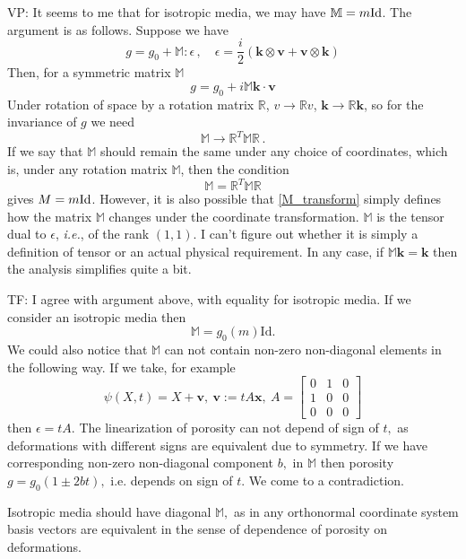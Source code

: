 \documentclass[12pt]{article}
\numberwithin{theorem}{section}
\begin{document}
\begin{framed} 
\color{red}
VP: It seems to me that for isotropic media, we may have $\mathbb{M}=m {\rm Id}$. The argument is as follows. Suppose we have 
\[ 
g=g_0 + \mathbb{M}: \epsilon \, , \quad 
\epsilon = \frac{i}{2} \left( \mathbf{k} \otimes \mathbf{v} + \mathbf{v} \otimes \mathbf{k} \right)
\] 
Then, for a symmetric matrix $\mathbb{M}$
\[ 
g=g_0 + i \mathbb{M} \mathbf{k} \cdot \mathbf{v} 
\] 
Under rotation of space by a rotation matrix $\mathbb{R}$, $v \rightarrow \mathbb{R} v$, 
$\mathbf{k} \rightarrow \mathbb{R}\mathbf{k}$, 
so for the invariance of $g$ we need 
\begin{equation} 
\label{M_transform} 
\mathbb{M} \rightarrow \mathbb{R}^T \mathbb{M} \mathbb{R} \, . 
\end{equation} 
If we say that $\mathbb{M}$ should remain the same under any choice of coordinates, which is, under any rotation matrix $\mathbb{M}$, then the condition 
\[ 
\mathbb{M} =\mathbb{R}^T \mathbb{M} \mathbb{R}
\] 
gives $M=m {\rm Id}$. However, it is also possible that \eqref{M_transform} simply defines how the matrix $\mathbb{M}$ changes under the coordinate transformation. $\mathbb{M}$ is the tensor dual to $\epsilon$, \emph{i.e.}, of the rank $(1,1)$. 
I can't figure out whether it is simply a definition of tensor or an actual physical requirement. In any case, if $\mathbb{M} \mathbf{k}= \mathbf{k}$ then the analysis simplifies quite a bit.

\color{blue} 
TF: I agree with argument above, with equality for isotropic media.
If we consider an isotropic media then
\[\mathbb{M} = g_0 (m) \mathrm{Id}.\]
We could also notice that $\mathbb{M}$ can not contain non-zero non-diagonal elements in the following way. If we take, for example  \[\psi(X,t) = X + \mathbf{v},\ \mathbf{v} := tA\mathbf{x},\ A = \left[\begin{array}{ccc}0 & 1 & 0 \\ 1& 0&0\\ 0 &0 &0\end{array}\right]\] 
then $\epsilon = tA.$ The linearization of porosity can not depend of sign of $t,$ as deformations with different signs are equivalent due to symmetry. If we have corresponding non-zero non-diagonal component $b,$ in $\mathbb{M}$ then porosity $g = g_0(1 \pm 2bt),$ i.e. depends on sign of $t.$ We come to a contradiction.

Isotropic media should have diagonal $\mathbb{M},$ as in any orthonormal coordinate system basis vectors are equivalent in the sense of dependence of porosity on deformations.
\color{black}
\end{framed} 
\end{document}
